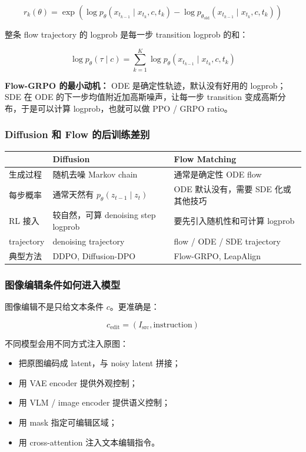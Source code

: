 \[
r_k(\theta)
=
\exp
\left(
\log p_\theta(x_{t_{k-1}}\mid x_{t_k},c,t_k)
-
\log p_{\theta_{\text{old}}}(x_{t_{k-1}}\mid x_{t_k},c,t_k)
\right)
\]

整条 flow trajectory 的 logprob 是每一步 transition logprob 的和：

\[
\log p_\theta(\tau\mid c)
=
\sum_{k=1}^{K}
\log p_\theta(x_{t_{k-1}}\mid x_{t_k},c,t_k)
\]

\begin{summarybox}
\textbf{Flow-GRPO 的最小动机：} ODE 是确定性轨迹，默认没有好用的 logprob；SDE 在 ODE 的下一步均值附近加高斯噪声，让每一步 transition 变成高斯分布，于是可以计算 logprob，也就可以做 PPO / GRPO ratio。
\end{summarybox}

\subsubsection{Diffusion 和 Flow 的后训练差别}

\begin{center}
{\small
\begin{tabular}{p{3cm}p{4.8cm}p{4.8cm}}
\hline
 & \textbf{Diffusion} & \textbf{Flow Matching} \\
\hline
生成过程
&
随机去噪 Markov chain
&
通常是确定性 ODE flow
\\
每步概率
&
通常天然有 $p_\theta(z_{t-1}\mid z_t)$
&
ODE 默认没有，需要 SDE 化或其他技巧
\\
RL 接入
&
较自然，可算 denoising step logprob
&
要先引入随机性和可计算 logprob
\\
trajectory
&
denoising trajectory
&
flow / ODE / SDE trajectory
\\
典型方法
&
DDPO, Diffusion-DPO
&
Flow-GRPO, LeapAlign
\\
\hline
\end{tabular}
}
\end{center}

\subsubsection{图像编辑条件如何进入模型}

图像编辑不是只给文本条件 $c$。更准确是：

\[
c_\text{edit}
=
(I_\text{src}, \text{instruction})
\]

不同模型会用不同方式注入原图：

\begin{itemize}[leftmargin=1.5em]
  \item 把原图编码成 latent，与 noisy latent 拼接；
  \item 用 VAE encoder 提供外观控制；
  \item 用 VLM / image encoder 提供语义控制；
  \item 用 mask 指定可编辑区域；
  \item 用 cross-attention 注入文本编辑指令。
\end{itemize}

